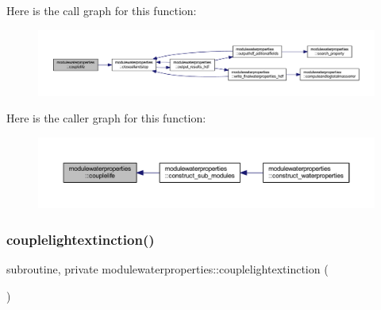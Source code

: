 Here is the call graph for this function\+:\nopagebreak
\begin{figure}[H]
\begin{center}
\leavevmode
\includegraphics[width=350pt]{namespacemodulewaterproperties_a2568e97ada2e06111796b52ea4b7c50a_cgraph}
\end{center}
\end{figure}
Here is the caller graph for this function\+:\nopagebreak
\begin{figure}[H]
\begin{center}
\leavevmode
\includegraphics[width=350pt]{namespacemodulewaterproperties_a2568e97ada2e06111796b52ea4b7c50a_icgraph}
\end{center}
\end{figure}
\mbox{\label{namespacemodulewaterproperties_a26a4b3541362ed971440672979e6fedb}} 
\subsubsection{\texorpdfstring{couplelightextinction()}{couplelightextinction()}}
{\footnotesize\ttfamily subroutine, private modulewaterproperties\+::couplelightextinction (\begin{DoxyParamCaption}{ }\end{DoxyParamCaption})\hspace{0.3cm}{\ttfamily [private]}}

